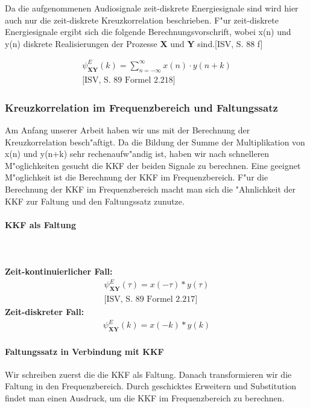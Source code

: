 \noindent Da die aufgenommenen Audiosignale zeit-diskrete Energiesignale sind wird hier auch nur die zeit-diskrete Kreuzkorrelation beschrieben. F"ur zeit-diskrete Energiesignale ergibt sich die folgende Berechnungsvorschrift, wobei x(n) und y(n) diskrete Realisierungen der Prozesse \textbf{X} und \textbf{Y} sind.[ISV, S. 88 f]

\begin{align}
\boxed{\psi_{\textbf {XY}}^E(k) = \sum_{n = -\infty}^{\infty} x(n) \cdot y(n+k)}\\\text{[ISV, S. 89 Formel 2.218]}
\end{align}

\subsubsection{Kreuzkorrelation im Frequenzbereich und Faltungssatz}
Am Anfang unserer Arbeit haben wir uns mit der Berechnung der Kreuzkorrelation besch"aftigt. Da die Bildung der Summe der Multiplikation von x(n) und y(n+k) sehr rechenaufw"andig ist, haben wir nach schnelleren M"oglichkeiten gesucht die KKF der beiden Signale zu berechnen. Eine geeignet M"oglichkeit ist die Berechnung der KKF im Frequenzbereich. F"ur die Berechnung der KKF im Frequenzbereich macht man sich die "Ahnlichkeit der KKF zur Faltung und den Faltungssatz zunutze.

\paragraph{KKF als Faltung}\textbf{\\\\Zeit-kontinuierlicher Fall:}
\begin{align}
\psi_{\textbf {XY}}^E(\tau) = x(-\tau) * y(\tau)\\\text{[ISV, S. 89 Formel 2.217]}
\end{align}
\textbf{Zeit-diskreter Fall:}
\begin{align}
\psi_{\textbf {XY}}^E(k) = x(-k) * y(k)
\end{align}
\paragraph{Faltungssatz in Verbindung mit KKF}Wir schreiben zuerst die die KKF als Faltung. Danach transformieren wir die Faltung in den Frequenzbereich. Durch geschicktes Erweitern und Substitution findet man einen Ausdruck, um die KKF im Frequenzbereich zu berechnen.

